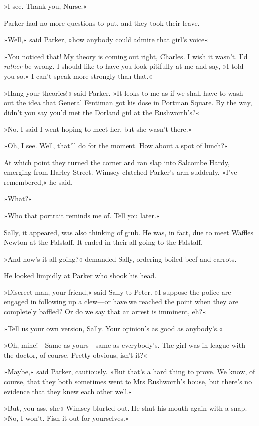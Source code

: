 »I see. Thank you, Nurse.«

Parker had no more questions to put, and they took their leave.

»Well,« said Parker, »how anybody could admire that girl's voice\longdash«

»You noticed that! My theory is coming out right, Charles. I wish it wasn't. I'd \textit{rather} be wrong. I should like to have you look pitifully at me and say, »I told you so.« I can't speak more strongly than that.«

»Hang your theories!« said Parker. »It looks to me as if we shall have to wash out the idea that General Fentiman got his dose in Portman Square. By the way, didn't you say you'd met the Dorland girl at the Rushworth's?«

»No. I said I went hoping to meet her, but she wasn't there.«

»Oh, I see. Well, that'll do for the moment. How about a spot of lunch?«

At which point they turned the corner and ran slap into Salcombe Hardy, emerging from Harley Street. Wimsey clutched Parker's arm suddenly. »I've remembered,« he said.

»What?«

»Who that portrait reminds me of. Tell you later.«

Sally, it appeared, was also thinking of grub. He was, in fact, due to meet Waffles Newton at the Falstaff. It ended in their all going to the Falstaff.

»And how's it all going?« demanded Sally, ordering boiled beef and carrots.

He looked limpidly at Parker who shook his head.

»Discreet man, your friend,« said Sally to Peter. »I suppose the police are engaged in following up a clew—or have we reached the point when they are completely baffled? Or do we say that an arrest is imminent, eh?«

»Tell us your own version, Sally. Your opinion's as good as anybody's.«

»Oh, mine!—Same as yours—same as everybody's. The girl was in league with the doctor, of course. Pretty obvious, isn't it?«

»Maybe,« said Parker, cautiously. »But that's a hard thing to prove. We know, of course, that they both sometimes went to Mrs Rushworth's house, but there's no evidence that they knew each other well.«

»But, you ass, she\longdash« Wimsey blurted out. He shut his mouth again with a snap. »No, I won't. Fish it out for yourselves.«

